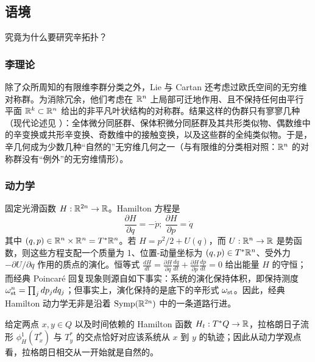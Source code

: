 \subsection{语境}

究竟为什么要研究辛拓扑？

\subsubsection{李理论}

除了众所周知的有限维李群分类之外，Lie 与 Cartan 还考虑过欧氏空间的无穷维对称群。为消除冗余，他们考虑在 $\mathbb{R}^n$ 上局部可迁地作用、且不保持任何由平行平面 $\mathbb{R}^k \subset \mathbb{R}^n$ 给出的非平凡叶状结构的对称群。结果这样的伪群只有寥寥几种（现代论述见 \cite{SingerSternberg}）：全体微分同胚群、保体积微分同胚群及其共形类似物、偶数维中的辛变换或共形辛变换、奇数维中的接触变换，以及这些群的全纯类似物。于是，辛几何成为少数几种“自然的”无穷维几何之一（与有限维的分类相对照：$\mathbb{R}^n$ 的对称群没有“例外”的无穷维情形）。

\subsubsection{动力学}

固定光滑函数 $H: \mathbb{R}^{2n} \rightarrow \mathbb{R}$。Hamilton 方程是
\[
\frac{\partial H}{\partial q} = -\dot{p}; \ \frac{\partial H}{\partial p} = \dot{q}
\]
其中 $(q,p) \in \mathbb{R}^n \times \mathbb{R}^n = T^*\mathbb{R}^n$。若 $H = p^2/2 + U(q)$，而 $U: \mathbb{R}^n \rightarrow \mathbb{R}$ 是势函数，则这些方程支配一个质量为 1、位置-动量坐标为 $(q,p) \in T^*\mathbb{R}^n$、受外力 $ -\partial U /\partial q$ 作用的质点的演化。恒等式
$
\frac{dH}{dt} =  \frac{\partial H}{\partial q} \frac{dq}{dt} + \frac{\partial H}{\partial p} \frac{dp}{dt} = 0
$
给出能量 $H$ 的守恒；而经典 Poincar\'e 回复现象则源自如下事实：系统的演化保持体积，即保持测度 $\omega_{\operatorname{st}}^n = \prod_j dp_j dq_j$；但事实上，演化保持的是底下的辛形式 $\omega_{\operatorname{st}}$。因此，经典 Hamilton 动力学无非是沿着 $\mathrm{Symp}(\mathbb{R}^{2n})$ 中的一条道路行进。


给定两点 $x,y \in Q$ 以及时间依赖的 Hamilton 函数 $H_t: T^*Q \rightarrow \mathbb{R}$，拉格朗日子流形 $\phi_H^1(T_x^*)$ 与 $T_y^*$ 的交点恰好对应该系统从 $x$ 到 $y$ 的轨迹；因此从动力学观点看，拉格朗日相交从一开始就是自然的。

